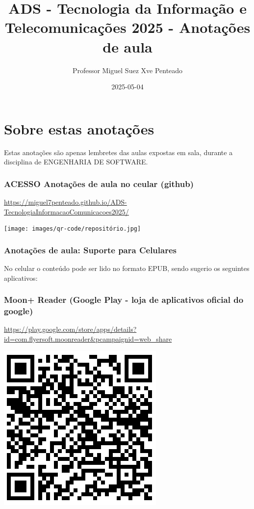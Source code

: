 \documentclass[
]{book}
\title{ADS - Tecnologia da Informação e Telecomunicações 2025 - Anotações de aula}
\author{Professor Miguel Suez Xve Penteado}
\date{2025-05-04}
\begin{document}
\maketitle

{
\setcounter{tocdepth}{1}
\tableofcontents
}
\chapter*{Sobre estas anotações}\label{sobre-estas-anotauxe7uxf5es}

Estas anotações são apenas lembretes das aulas expostas em sala, durante a disciplina de ENGENHARIA DE SOFTWARE.

\subsection{ACESSO Anotações de aula no ceular (github)}\label{acesso-anotauxe7uxf5es-de-aula-no-ceular-github}

\url{https://miguel7penteado.github.io/ADS-TecnologiaInformacaoComunicacoes2025/}

\texttt{[image: images/qr-code/repositório.jpg]}

\subsection{Anotações de aula: Suporte para Celulares}\label{anotauxe7uxf5es-de-aula-suporte-para-celulares}

No celular o conteúdo pode ser lido no formato EPUB, sendo sugerio os seguintes aplicativos:

\subsection{\texorpdfstring{\textbf{Moon+ Reader (Google Play - loja de aplicativos oficial do google)}}{Moon+ Reader (Google Play - loja de aplicativos oficial do google)}}\label{moon-reader-google-play---loja-de-aplicativos-oficial-do-google}

\url{https://play.google.com/store/apps/details?id=com.flyersoft.moonreader&pcampaignid=web_share}

\includegraphics{images/qr-code/leitor_ebook/MoonReaderPlus.jpg}
\end{document}
